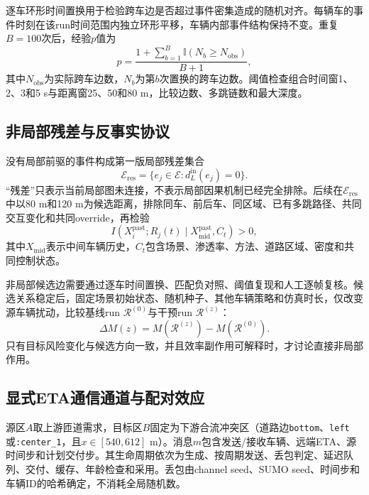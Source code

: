 \documentclass[journal]{IEEEtran}
\begin{document}
逐车环形时间置换用于检验跨车边是否超过事件密集造成的随机对齐。每辆车的事件时刻在该run时间范围内独立环形平移，车辆内部事件结构保持不变。重复$B=100$次后，经验$p$值为
\begin{equation}
p=\frac{1+\sum_{b=1}^{B}\mathbb{I}(N_b\geq N_{\mathrm{obs}})}{B+1},
\label{eq:null_p}
\end{equation}
其中$N_{\mathrm{obs}}$为实际跨车边数，$N_b$为第$b$次置换的跨车边数。阈值检查组合时间窗1、2、3和5 s与距离窗25、50和80 m，比较边数、多跳链数和最大深度。

\subsection{非局部残差与反事实协议}

没有局部前驱的事件构成第一版局部残差集合
\begin{equation}
\mathcal{E}_{\mathrm{res}}=\{e_j\in\mathcal{E}:d_{L}^{\mathrm{in}}(e_j)=0\}.
\end{equation}
“残差”只表示当前局部图未连接，不表示局部因果机制已经完全排除。后续在$\mathcal{E}_{\mathrm{res}}$中以80 m和120 m为候选距离，排除同车、前后车、同区域、已有多跳路径、共同交互变化和共同override，再检验
\begin{equation}
I\!\left(X_i^{\mathrm{past}};R_j(t)\mid
X_{\mathrm{mid}}^{\mathrm{past}},C_t\right)>0,
\label{eq:cmi}
\end{equation}
其中$X_{\mathrm{mid}}$表示中间车辆历史，$C_t$包含场景、渗透率、方法、道路区域、密度和共同控制状态。

非局部候选边需要通过逐车时间置换、匹配负对照、阈值复现和人工逐帧复核。候选关系稳定后，固定场景初始状态、随机种子、其他车辆策略和仿真时长，仅改变源车辆扰动，比较基线run $\mathcal{R}^{(0)}$与干预run $\mathcal{R}^{(z)}$：
\begin{equation}
\Delta M(z)=M(\mathcal{R}^{(z)})-M(\mathcal{R}^{(0)}).
\end{equation}
只有目标风险变化与候选方向一致，并且效率副作用可解释时，才讨论直接非局部作用。

\subsection{显式ETA通信通道与配对效应}

源区$A$取上游匝道需求，目标区$B$固定为下游合流冲突区（道路边\texttt{bottom}、\texttt{left}或\texttt{:center\_1}，且$x\in[540,612]$ m）。消息$m$包含发送/接收车辆、远端ETA、源时间步和计划交付步。其生命周期依次为生成、按周期发送、丢包判定、延迟队列、交付、缓存、年龄检查和采用。丢包由channel seed、SUMO seed、时间步和车辆ID的哈希确定，不消耗全局随机数。
\end{document}
